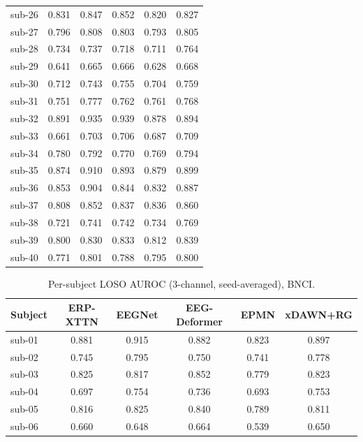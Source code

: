 \begin{table}[t]
\begin{tabular}{lccccc}
sub-26 & 0.831 & 0.847 & 0.852 & 0.820 & 0.827 \\
sub-27 & 0.796 & 0.808 & 0.803 & 0.793 & 0.805 \\
sub-28 & 0.734 & 0.737 & 0.718 & 0.711 & 0.764 \\
sub-29 & 0.641 & 0.665 & 0.666 & 0.628 & 0.668 \\
sub-30 & 0.712 & 0.743 & 0.755 & 0.704 & 0.759 \\
sub-31 & 0.751 & 0.777 & 0.762 & 0.761 & 0.768 \\
sub-32 & 0.891 & 0.935 & 0.939 & 0.878 & 0.894 \\
sub-33 & 0.661 & 0.703 & 0.706 & 0.687 & 0.709 \\
sub-34 & 0.780 & 0.792 & 0.770 & 0.769 & 0.794 \\
sub-35 & 0.874 & 0.910 & 0.893 & 0.879 & 0.899 \\
sub-36 & 0.853 & 0.904 & 0.844 & 0.832 & 0.887 \\
sub-37 & 0.808 & 0.852 & 0.837 & 0.836 & 0.860 \\
sub-38 & 0.721 & 0.741 & 0.742 & 0.734 & 0.769 \\
sub-39 & 0.800 & 0.830 & 0.833 & 0.812 & 0.839 \\
sub-40 & 0.771 & 0.801 & 0.788 & 0.795 & 0.800 \\
\bottomrule
\end{tabular}
\end{table}

\begin{table}[t]
\centering
\scriptsize
\caption{Per-subject LOSO AUROC (3-channel, seed-averaged), BNCI.}
\label{tab:persubj-bnci}
\begin{tabular}{lccccc}
\toprule
Subject & ERP-XTTN & EEGNet & EEG-Deformer & EPMN & xDAWN+RG \\
\midrule
sub-01 & 0.881 & 0.915 & 0.882 & 0.823 & 0.897 \\
sub-02 & 0.745 & 0.795 & 0.750 & 0.741 & 0.778 \\
sub-03 & 0.825 & 0.817 & 0.852 & 0.779 & 0.823 \\
sub-04 & 0.697 & 0.754 & 0.736 & 0.693 & 0.753 \\
sub-05 & 0.816 & 0.825 & 0.840 & 0.789 & 0.811 \\
sub-06 & 0.660 & 0.648 & 0.664 & 0.539 & 0.650 \\
\bottomrule
\end{tabular}
\end{table}

